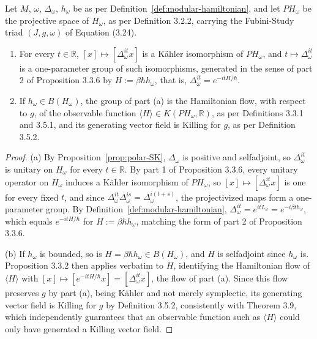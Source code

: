 \begin{proposition}\label{prop:modular-kahler}
	Let $M$, $\omega$, $\Delta_\omega$, $h_\omega$ be as per Definition~\ref{def:modular-hamiltonian}, and let $PH_\omega$ be the projective space of $H_\omega$, as per Definition 3.2.2, carrying the Fubini-Study triad $(J,g,\omega)$ of Equation (3.24).
	\begin{enumerate}
		\item[(a)] For every $t \in \mathbb{R}$, $[x] \mapsto [\Delta_\omega^{it}x]$ is a Kähler isomorphism of $PH_\omega$, and $t \mapsto \Delta_\omega^{it}$ is a one-parameter group of such isomorphisms, generated in the sense of part 2 of Proposition 3.3.6 by $H := \beta\hbar h_\omega$, that is, $\Delta_\omega^{it}=e^{-itH/\hbar}$.
		\item[(b)] If $h_\omega \in B(H_\omega)$, the group of part (a) is the Hamiltonian flow, with respect to $g$, of the observable function $\langle H \rangle \in K(PH_\omega,\mathbb{R})$, as per Definitions 3.3.1 and 3.5.1, and its generating vector field is Killing for $g$, as per Definition 3.5.2.
	\end{enumerate}
\end{proposition}

\begin{proof}
	(a) By Proposition~\ref{prop:polar-SK}, $\Delta_\omega$ is positive and selfadjoint, so $\Delta_\omega^{it}$ is unitary on $H_\omega$ for every $t \in \mathbb{R}$. By part 1 of Proposition 3.3.6, every unitary operator on $H_\omega$ induces a Kähler isomorphism of $PH_\omega$, so $[x]\mapsto[\Delta_\omega^{it}x]$ is one for every fixed $t$, and since $\Delta_\omega^{it}\Delta_\omega^{is}=\Delta_\omega^{i(t+s)}$, the projectivized maps form a one-parameter group. By Definition~\ref{def:modular-hamiltonian}, $\Delta_\omega^{it}=e^{itL_\omega}=e^{-i\beta t h_\omega}$, which equals $e^{-itH/\hbar}$ for $H:=\beta\hbar h_\omega$, matching the form of part 2 of Proposition 3.3.6.
	
	(b) If $h_\omega$ is bounded, so is $H=\beta\hbar h_\omega \in B(H_\omega)$, and $H$ is selfadjoint since $h_\omega$ is. Proposition 3.3.2 then applies verbatim to $H$, identifying the Hamiltonian flow of $\langle H\rangle$ with $[x]\mapsto[e^{-itH/\hbar}x]=[\Delta_\omega^{it}x]$, the flow of part (a). Since this flow preserves $g$ by part (a), being Kähler and not merely symplectic, its generating vector field is Killing for $g$ by Definition 3.5.2, consistently with Theorem 3.9, which independently guarantees that an observable function such as $\langle H\rangle$ could only have generated a Killing vector field.
\end{proof}

